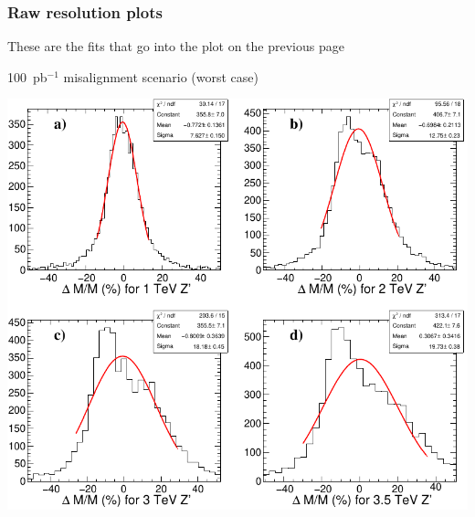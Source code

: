 \documentclass[compress]{beamer}
\begin{document}
\begin{frame}
\frametitle{Raw resolution plots}
These are the fits that go into the plot on the previous page

\vspace{0.2 cm} 100~pb$^{-1}$ misalignment scenario (worst case)

\begin{center} \includegraphics[width=0.6\linewidth]{four_plots.pdf} \end{center}
\end{frame}


\end{document}
